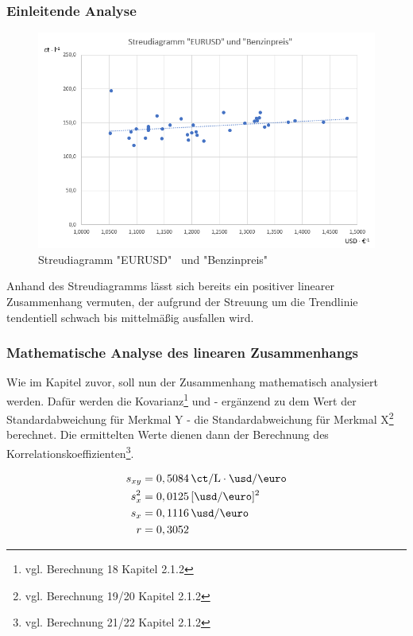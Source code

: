 \subsubsection{Einleitende Analyse}
\begin{figure}[H]
  \centering
  \includegraphics[width = \textwidth]{graphics/streueurusdbenz.png}
  \caption{Streudiagramm "EURUSD" \, und "Benzinpreis"}
  \label{fig:streuEURBenz}
\end{figure}

Anhand des Streudiagramms lässt sich bereits ein positiver linearer Zusammenhang vermuten, der aufgrund der Streuung um die Trendlinie tendentiell schwach bis mittelmäßig ausfallen wird.\\

\subsubsection{Mathematische Analyse des linearen Zusammenhangs}
Wie im Kapitel zuvor, soll nun der Zusammenhang mathematisch analysiert werden.
Dafür werden die Kovarianz\footnote{vgl. Berechnung 18 Kapitel 2.1.2} und - ergänzend zu dem Wert der Standardabweichung für Merkmal Y - die Standardabweichung für Merkmal X\footnote{vgl. Berechnung 19/20 Kapitel 2.1.2} berechnet. Die ermittelten Werte dienen dann der Berechnung des Korrelationskoeffizienten\footnote{vgl. Berechnung 21/22 Kapitel 2.1.2}.

\begin{align}
  s_{xy} &= 0,5084 \, \si{\ct\per\liter} \cdot \si{\usd\per\euro}\\
  s_{x}^2 &= 0,0125 \, [\si{\usd\per\euro}]^2\\
  s_x &= 0,1116 \, \si{\usd\per\euro}\\
  r &= 0,3052
\end{align}

